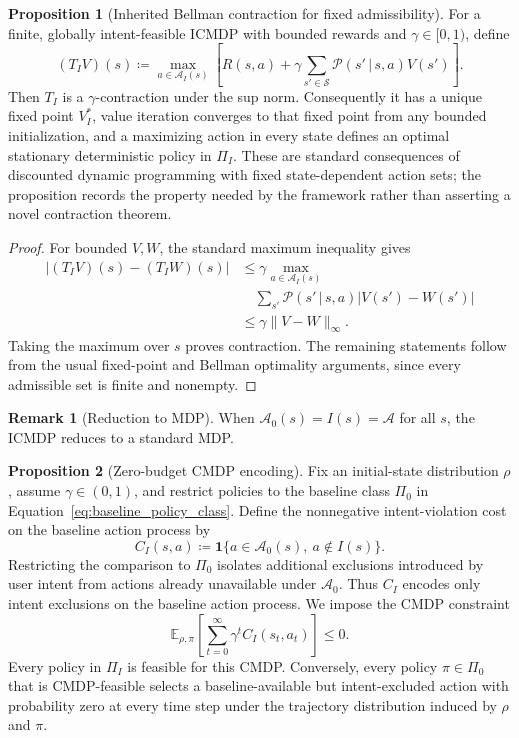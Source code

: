\documentclass[journal]{IEEEtran}
\theoremstyle{definition}
\newtheorem{proposition}{Proposition}[section]
\newtheorem{remark}{Remark}[section]
\newcommand{\cS}{\mathcal{S}}
\newcommand{\cA}{\mathcal{A}}
\newcommand{\cP}{\mathcal{P}}
\newcommand{\E}{\mathbb{E}}
\newcommand{\given}{\,\vert\,}
\begin{document}
\begin{proposition}[Inherited Bellman contraction for fixed admissibility]
\label{thm:contraction}
For a finite, globally
intent-feasible ICMDP with bounded rewards and
$\gamma\in[0,1)$, define
\[
  (T_I V)(s) \coloneqq
  \max_{a\in\cA_I(s)}
  \left[R(s,a)+\gamma\sum_{s'\in\cS}
  \cP(s'\given s,a)V(s')\right].
\]
Then $T_I$ is a $\gamma$-contraction under the sup norm. Consequently it has
a unique fixed point $V_I^*$, value iteration converges to that fixed point
from any bounded initialization, and a maximizing action in every state
defines an optimal stationary deterministic policy in $\Pi_I$.
These are standard consequences of discounted dynamic programming with
fixed state-dependent action sets; the proposition records the property needed
by the framework rather than asserting a novel contraction theorem.
\end{proposition}

\begin{proof}
For bounded $V,W$, the standard maximum inequality gives
\begin{align*}
 |(T_I V)(s)-(T_I W)(s)|
 &\leq \gamma\max_{a\in\cA_I(s)}\\
 &\quad\sum_{s'}\cP(s'\given s,a)|V(s')-W(s')| \\
 &\leq\gamma\lVert V-W\rVert_\infty .
\end{align*}
Taking the maximum over $s$ proves contraction. The remaining statements follow from
the usual fixed-point and Bellman optimality arguments, since every admissible
set is finite and nonempty.
\end{proof}

\begin{remark}[Reduction to MDP]
When $\cA_0(s)=I(s)=\cA$ for
all $s$, the ICMDP reduces to a standard MDP.
\end{remark}

\begin{proposition}[Zero-budget CMDP encoding]
\label{prop:cmdp_encoding}
Fix an initial-state distribution $\rho$, assume $\gamma\in(0,1)$, and restrict
policies to the baseline class $\Pi_0$ in
Equation~\eqref{eq:baseline_policy_class}. Define the nonnegative
intent-violation cost on the baseline action process by
\[
 C_I(s,a)\coloneqq
 \mathbf{1}\{a\in\cA_0(s),\ a\notin I(s)\}.
\]
Restricting the comparison to $\Pi_0$ isolates additional exclusions introduced
by user intent from actions already unavailable under $\cA_0$. Thus $C_I$
encodes only intent exclusions on the baseline action process. We
impose the CMDP constraint
\[
 \E_{\rho,\pi}\!\left[\sum_{t=0}^{\infty}
 \gamma^t C_I(s_t,a_t)\right]\leq 0.
\]
Every policy in $\Pi_I$ is feasible for this CMDP. Conversely, every policy
$\pi\in\Pi_0$ that is CMDP-feasible selects a baseline-available but
intent-excluded action with probability zero at every time step under the
trajectory distribution induced by $\rho$ and $\pi$.
\end{proposition}
\end{document}
